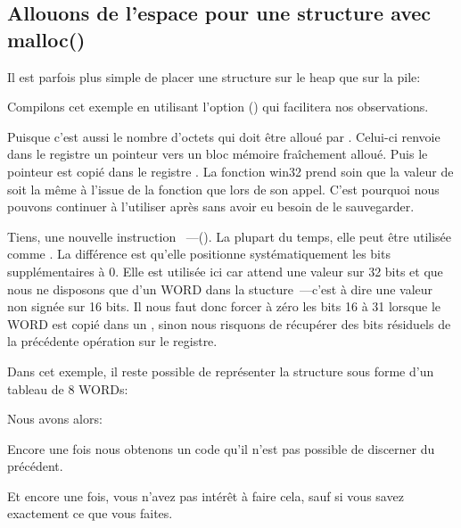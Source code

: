 ﻿\subsection{Allouons de l'espace pour une structure avec malloc()}
\label{struct_malloc_example}

Il est parfois plus simple de placer une structure sur le \gls{heap} que sur la pile:



Compilons cet exemple en utilisant l'option (\Ox) qui facilitera nos observations.




Puisque  c'est aussi le nombre d'octets qui doit être alloué par 
. Celui-ci renvoie dans le registre \EAX un pointeur vers un bloc mémoire fraîchement 
alloué. Puis le pointeur est copié dans le registre \ESI.
La fonction win32  prend soin que la valeur de \ESI soit la même à l'issue de la 
fonction que lors de son appel. C'est pourquoi nous pouvons continuer à l'utiliser après sans avoir 
eu besoin de le sauvegarder.


Tiens, une nouvelle instruction ~---\MOVZX ().
La plupart du temps, elle peut être utilisée comme \MOVSX. La différence est qu'elle positionne 
systématiquement les bits supplémentaires à 0.
Elle est utilisée ici car \printf attend une valeur sur 32 bits et que nous ne disposons que d'un 
WORD dans la stucture~---c'est à dire une valeur non signée sur 16 bits. Il nous faut donc forcer 
à zéro les bits 16 à 31 lorsque le WORD est copié dans un \Tint{}, sinon nous risquons de 
récupérer des bits résiduels de la précédente opération sur le registre.

Dans cet exemple, il reste possible de représenter la structure sous forme d'un tableau de 8 WORDs:



Nous avons alors:



Encore une fois nous obtenons un code qu'il n'est pas possible de discerner du précédent.

Et encore une fois, vous n'avez pas intérêt à faire cela, sauf si vous savez exactement ce que vous 
faites.

